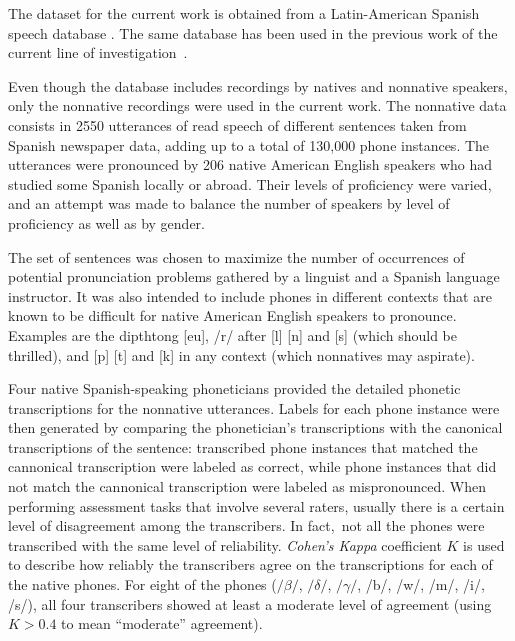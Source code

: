 The dataset for the current work is obtained from a Latin-American Spanish speech database
\cite{database_collection}.  The same database has been used in the previous work of the
current line of \mbox{investigation \cite{main}}.

Even though the database includes recordings by natives and nonnative
speakers, only the nonnative recordings were used in the current work.
The nonnative data consists in 2550 utterances of read speech of different sentences
taken from Spanish newspaper data, adding up to
a total of 130,000 phone instances. The utterances were pronounced by 206 native American English
speakers who had studied some Spanish locally or abroad. Their levels of proficiency were varied,
and an attempt was made to balance the number of speakers by level of proficiency as well as by
gender.

The set of sentences was chosen to maximize the number of
occurrences of potential pronunciation problems gathered by a linguist and a Spanish language
instructor. It was also intended to include phones in different contexts that are known to be
difficult for native American English speakers to pronounce.
Examples are the dipthtong [eu], /r/ after [l] [n] and [s] (which should be
thrilled), and [p] [t] and [k] in any context (which nonnatives may aspirate).

Four native Spanish-speaking phoneticians provided the detailed phonetic transcriptions
for the nonnative utterances. Labels
for each phone instance were then generated by comparing the phonetician's transcriptions with
the canonical transcriptions of the sentence: transcribed phone instances that
matched the cannonical transcription were labeled as correct, while phone instances that did not
match the cannonical transcription were labeled as mispronounced. When performing assessment
tasks that involve several raters, usually there is a certain level of disagreement among the
transcribers. In fact, not all the phones were transcribed with the same level of reliability.
\textit{Cohen's Kappa} coefficient $K$ \cite{kappa} is used to describe how reliably the
transcribers agree on the transcriptions for each of the native phones. For eight of the phones
($/\beta/$, $/\delta/$, $/\gamma/$, /b/, /w/, /m/, /i/, /s/), all four transcribers showed at least
a moderate level of agreement (using $K > 0.4$ to mean ``moderate'' agreement).

